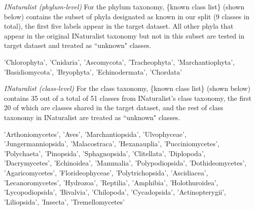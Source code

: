 \documentclass[10pt]{article} %
\begin{document}
{\em INaturalist (phylum-level)}
For the phylum taxonomy, \{known class list\} (shown below) contains the subset of phyla designated as known in our split (9 classes in total), the first five labels appear in the target dataset. All other phyla that appear in the original INaturalist taxonomy but not in this subset are tested in target dataset and treated as ``unknown" classes.
\begin{promptquote}
'Chlorophyta', 'Cnidaria', 'Ascomycota', 'Tracheophyta', 'Marchantiophyta', 'Basidiomycota', 'Bryophyta', 'Echinodermata', 'Chordata'
\end{promptquote}

{\em INaturalist (class-level)}
For the class taxonomy, \{known class list\} (shown below) contains 35 out of a total of 51 classes from INaturalist's class taxonomy, the first 20 of which are classes shared in the target dataset, and the rest of class taxonomy in INaturalist are treated as ``unknown" classes.
\begin{promptquote}
'Arthoniomycetes', 'Aves', 'Marchantiopsida', 'Ulvophyceae', 'Jungermanniopsida', 'Malacostraca', 'Hexanauplia', 'Pucciniomycetes', 'Polychaeta', 'Pinopsida', 'Sphagnopsida', 'Clitellata', 'Diplopoda', 'Dacrymycetes', 'Echinoidea', 'Mammalia', 'Polypodiopsida', 'Dothideomycetes', 'Agaricomycetes', 'Florideophyceae', 'Polytrichopsida', 'Ascidiacea', 'Lecanoromycetes', 'Hydrozoa', 'Reptilia', 'Amphibia', 'Holothuroidea', 'Lycopodiopsida', 'Bivalvia', 'Chilopoda', 'Cycadopsida', 'Actinopterygii', 'Liliopsida', 'Insecta', 'Tremellomycetes'
\end{promptquote}
\end{document}
